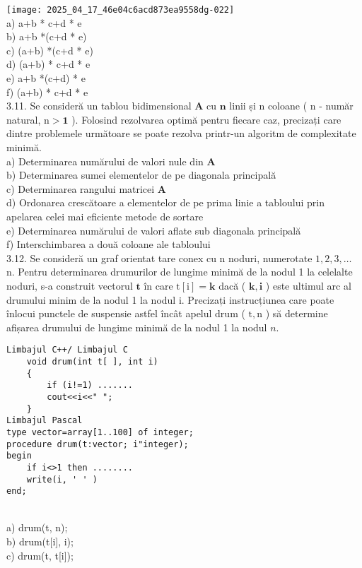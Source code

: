 \texttt{[image: 2025\_04\_17\_46e04c6acd873ea9558dg-022]}
\\
a) a+b * c+d * e
\\
b) a+b *(c+d * e)
\\
c) (a+b) *(c+d * e)
\\
d) (a+b) * c+d * e
\\
e) a+b *(c+d) * e
\\
f) (a+b) * c+d * e
\\
3.11. Se consideră un tablou bidimensional $\mathbf{A}$ cu $\mathbf{n}$ linii și n coloane ( n - număr natural, $\mathrm{n}>\mathbf{1}$ ). Folosind rezolvarea optimă pentru fiecare caz, precizați care dintre problemele următoare se poate rezolva printr-un algoritm de complexitate minimă.
\\
a) Determinarea numărului de valori nule din $\mathbf{A}$
\\
b) Determinarea sumei elementelor de pe diagonala principală
\\
c) Determinarea rangului matricei $\mathbf{A}$
\\
d) Ordonarea crescătoare a elementelor de pe prima linie a tabloului prin apelarea celei mai eficiente metode de sortare
\\
e) Determinarea numărului de valori aflate sub diagonala principală
\\
f) Interschimbarea a două coloane ale tabloului
\\
3.12. Se consideră un graf orientat tare conex cu n noduri, numerotate $1,2,3, \ldots$ n. Pentru determinarea drumurilor de lungime minimă de la nodul 1 la celelalte noduri, s-a construit vectorul $\mathbf{t}$ în care $\mathrm{t}[\mathrm{i}]=\mathbf{k}$ dacă ( $\mathbf{k}, \mathbf{i}$ ) este ultimul arc al drumului minim de la nodul 1 la nodul i. Precizați instrucțiunea care poate înlocui punctele de suspensie astfel încât apelul drum ( $\mathrm{t}, \mathrm{n}$ ) să determine afișarea drumului de lungime minimă de la nodul 1 la nodul $n$.
\begin{verbatim}
Limbajul C++/ Limbajul C
    void drum(int t[ ], int i)
    {
        if (i!=1) .......
        cout<<i<<" ";
    }
Limbajul Pascal
type vector=array[1..100] of integer;
procedure drum(t:vector; i"integer);
begin
    if i<>1 then ........
    write(i, ' ' )
end;
\end{verbatim}
\\
a) drum(t, n);
\\
b) drum(t[i], i);
\\
c) drum(t, t[i]);
\\
